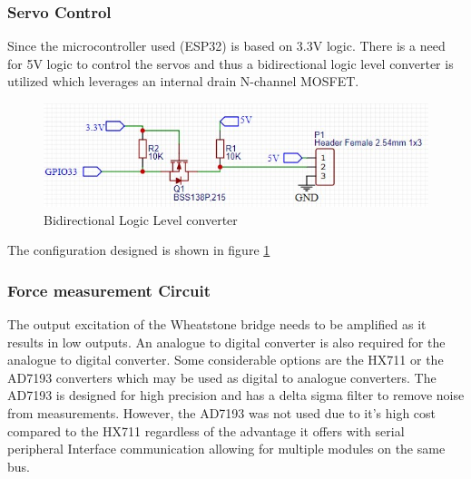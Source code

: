 \subsubsection{Servo Control}
Since the microcontroller used (ESP32) is based on 3.3V logic. There is a need for 5V logic to control the servos and thus a bidirectional logic level converter is utilized which leverages an internal drain N-channel MOSFET. 
\begin{center}
	\begin{figure}[H]
	\centering
	\includegraphics{Figures/logik}
	\caption[Bidirectional Logic Level converter]{Bidirectional Logic Level converter}
	\label{fig:logik}
	\end{figure}
\end{center}
The configuration designed is shown in figure \ref{fig:logik}

\subsubsection{Force measurement Circuit}

The output excitation of the Wheatstone bridge needs to be amplified as it results in low outputs. An analogue to digital converter is also required for the analogue to digital converter. Some considerable options are the HX711 or the AD7193 converters which may be used as digital to analogue converters. The AD7193 is designed for high precision and has a delta sigma filter to remove noise from measurements.  However, the AD7193 was not used due to it's high cost compared to the HX711 regardless of the advantage it offers with serial peripheral Interface communication allowing for multiple modules on the same bus.

